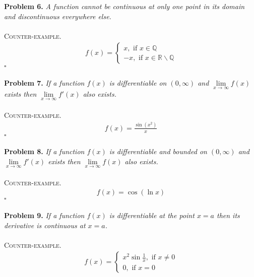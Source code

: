 \documentclass[a4paper]{article}
\numberwithin{equation}{section}
\begin{document}
\textbf{Problem 6.} \textit{A function cannot be continuous at only one point in its domain and discontinuous everywhere else.}\\
\\
\textsc{Counter-example.} 
\begin{align}
f\left( x \right) = \left\{ {\begin{array}{*{20}{c}}
{x,\mbox{ if } x \in \mathbb{Q}}\\
{ - x,\mbox{ if } x \in \mathbb{R}\backslash \mathbb{Q} }
\end{array}} \right.
\end{align}
\hfill $\square$\\
\\
\textbf{Problem 7.} \textit{If a function $ f(x)$ is differentiable on $\left( {0,\infty } \right)$ and $\mathop {\lim }\limits_{x \to \infty } f\left( x \right)$ exists then $\mathop {\lim }\limits_{x \to \infty } f'\left( x \right)$ also exists.}\\
\\
\textsc{Counter-example.}
\begin{align}
f\left( x \right) = \frac{{\sin \left( {{x^2}} \right)}}{x}
\end{align}
\hfill $\square$\\
\\
\textbf{Problem 8.} \textit{If a function $ f(x)$ is differentiable and bounded on $\left( {0,\infty } \right)$ and $\mathop {\lim }\limits_{x \to \infty } f'\left( x \right)$ exists then $\mathop {\lim }\limits_{x \to \infty } f\left( x \right)$ also exists.}\\
\\
\textsc{Counter-example.}
\begin{align}
f\left( x \right) = \cos \left( {\ln x} \right)
\end{align}
\hfill $\square$\\
\\
\textbf{Problem 9.} \textit{If a function $ f(x)$ is differentiable at the point $x=a$ then its derivative is continuous at $x=a$.}\\
\\
\textsc{Counter-example.} 
\begin{align}
f\left( x \right) = \left\{ {\begin{array}{*{20}{c}}
{{x^2}\sin \frac{1}{x},\mbox{ if } x \ne 0}\\
{0,\mbox{ if } x = 0}
\end{array}} \right.
\end{align}
\end{document}
